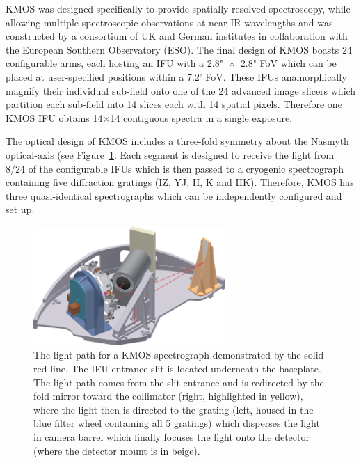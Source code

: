 KMOS was designed specifically to provide spatially-resolved spectroscopy, while allowing multiple spectroscopic observations at near-IR wavelengths and was constructed by a consortium of UK and German institutes in collaboration with the European Southern Observatory (ESO).
The final design of KMOS boasts 24 configurable arms, each hosting an IFU with a 2.8"~$\times$~2.8" FoV which can be placed at user-specified positions within a 7.2' FoV.
These IFUs anamorphically magnify their individual sub-field onto one of the 24 advanced image slicers which partition each sub-field into 14 slices each with 14 spatial pixels.
Therefore one KMOS IFU obtains 14$\times$14 contiguous spectra in a single exposure.

The optical design of KMOS includes a three-fold symmetry about the Nasmyth optical-axis (see Figure~\ref{fig:kmoslight}.
Each segment is designed to receive the light from 8/24 of the configurable IFUs which is then passed to a cryogenic spectrograph containing five diffraction gratings (IZ, YJ, H, K and HK).
Therefore, KMOS has three quasi-identical spectrographs which can be independently configured and set up.

\begin{figure}
 \centering
 \includegraphics[width=0.65\textwidth]{kmos/kmos-spectrograph}
 \caption[The KMOS light path]{The light path for a KMOS spectrograph demonstrated by the solid red line.
 The IFU entrance slit is located underneath the baseplate.
 The light path comes from the slit entrance and is redirected by the fold mirror toward the collimator (right, highlighted in yellow), where the light then is directed to the grating (left, housed in the blue filter wheel containing all 5 gratings) which disperses the light in camera barrel which finally focuses the light onto the detector (where the detector mount is in beige).
 \label{fig:kmoslight}}
\end{figure}

